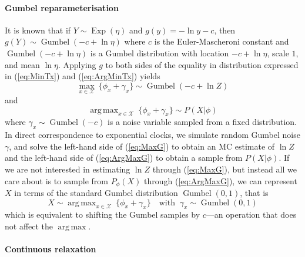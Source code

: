 \documentclass[11pt]{article}
\DeclareMathOperator*{\argmax}{arg\,max}
\DeclareMathOperator*{\Exp}{Exp}
\DeclareMathOperator*{\Gumbel}{Gumbel}
\begin{document}
\paragraph{Gumbel reparameterisation} It is known that if $Y \sim \Exp(\eta)$ and $g(y) = - \ln y - c$, then $g(Y) \sim \Gumbel(-c + \ln \eta)$ where $c$ is the Euler-Mascheroni constant and $\Gumbel(-c + \ln \eta)$ is a Gumbel distribution with location $-c + \ln \eta$,  scale $1$, and mean $\ln \eta$. Applying $g$ to both sides of the equality in distribution expressed in  (\ref{eq:MinTx}) and (\ref{eq:ArgMinTx}) yields
\begin{equation}\label{eq:MaxG}
	\max_{x \in \mathcal X} ~ \{\phi_x + \gamma_x \} \sim \Gumbel(-c + \ln Z)
\end{equation}
and
\begin{equation}\label{eq:ArgMaxG}
	\argmax_{x \in \mathcal X} ~ \{\phi_x + \gamma_x\} \sim P(X|\phi)
\end{equation}
where $\gamma_x \sim \Gumbel(-c)$ is a noise variable sampled from a fixed distribution.
%
In direct correspondence to exponential clocks, we simulate random Gumbel noise $\gamma$, and solve the left-hand side of (\ref{eq:MaxG}) to obtain an MC estimate of $\ln Z$ and the left-hand side of (\ref{eq:ArgMaxG}) to obtain a sample from $P(X|\phi)$.
If we are not interested in estimating $\ln Z$ through (\ref{eq:MaxG}), but instead all we care about is to sample from $P_\phi(X)$ through (\ref{eq:ArgMaxG}), we can represent $X$ in terms of the standard Gumbel distribution $\Gumbel(0, 1)$, that is
\begin{equation}\label{eq:X-rep}
	X \sim \argmax_{x \in \mathcal X} ~ \{\phi_x + \gamma_x\} \quad \text{with }~\gamma_x \sim \Gumbel(0, 1)
\end{equation}
which is equivalent to shifting the Gumbel samples by $c$---an operation that does not affect the $\argmax$.


\paragraph{Continuous relaxation} 
\end{document}
